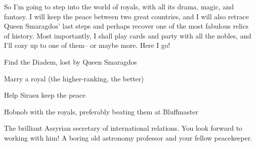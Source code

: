 \documentclass[char]{Kos}
\begin{document}
So I'm going to step into the world of royals, with all its drama, magic, and fantasy. I will keep the peace between two great countries, and I will also retrace Queen Smaragdos' last steps and perhaps recover one of the most fabulous relics of history. Most importantly, I shall play cards and party with all the nobles, and I'll cozy up to one of them-- or maybe more. Here I go!

\begin{itemz}[Goals]
\item Find the Diadem, lost by Queen Smaragdos
\item Marry a royal (the higher-ranking, the better)
\item Help Sirasu keep the peace
\item Hobnob with the royals, preferably beating them at Bluffmaster
\end{itemz}

\begin{contacts}
 The brilliant Assyrian secretary of international relations. You look forward to working with him!
\contact{\cAnarchist{}} A boring old astronomy professor and your fellow peacekeeper.
\end{contacts}
\end{document}
